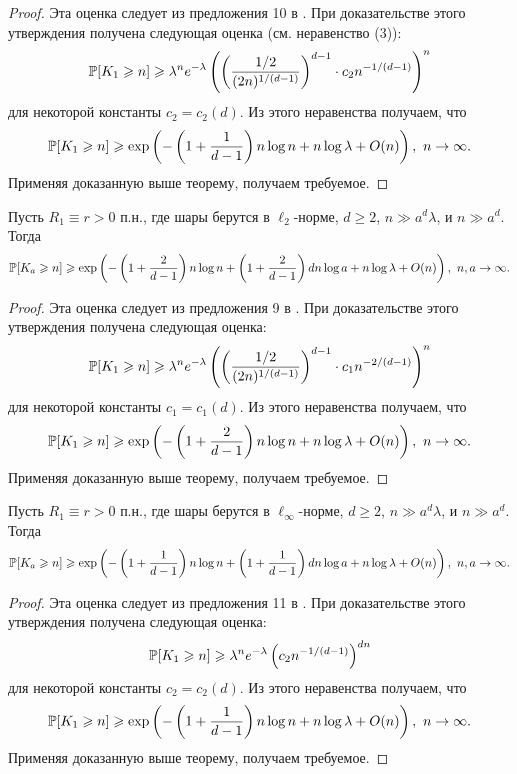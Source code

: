 \begin{proof}
    Эта оценка следует из предложения 10 в \cite{AL}. При доказательстве этого утверждения получена следующая оценка (см. неравенство (3)):
    $$\mathbb{P}[K_1 \geqslant n] \geqslant \lambda^n e^{-\lambda}\left(\left(\dfrac{1/2}{(2n)^{1/(d-1)}}\right)^{d-1}\cdot c_2n^{-1/(d-1)}\right)^n$$ для некоторой константы $c_2 = c_2(d)$. Из этого неравенства получаем, что
    $$\mathbb{P}[K_1 \geqslant n] \geqslant \exp \left(-\left(1+\dfrac{1}{d-1}\right)n\log n   +n\log\lambda + O(n)\right),\  n \to \infty.$$ Применяя доказанную выше теорему, получаем требуемое.
\end{proof}{}

\begin{cor}
Пусть $R_1\equiv r > 0$ п.н., где шары берутся в $\ell_2$-норме, $d\geq 2$, $n \gg a^d\lambda$, и $n\gg a^d$. 
Тогда $$\mathbb{P}[K_a \geqslant n] \geqslant \exp \left(-\left(1+\dfrac{2}{d-1}\right)n\log n + \left(1+\dfrac{2}{d-1}\right)dn\log a  +n\log\lambda + O(n)\right),\  n, a\to \infty.$$
\end{cor}{}

\begin{proof}
    Эта оценка следует из предложения 9 в \cite{AL}. При доказательстве этого утверждения получена следующая оценка:
    $$\mathbb{P}[K_1 \geqslant n] \geqslant \lambda^n e^{-\lambda}\left(\left(\dfrac{1/2}{(2n)^{1/(d-1)}}\right)^{d-1}\cdot c_1n^{-2/(d-1)}\right)^n$$ для некоторой константы $c_1 = c_1(d)$. Из этого неравенства получаем, что 
    $$\mathbb{P}[K_1 \geqslant n] \geqslant \exp \left(-\left(1+\dfrac{2}{d-1}\right)n\log n   +n\log\lambda + O(n)\right),\  n \to \infty.$$  Применяя доказанную выше теорему, получаем требуемое.
\end{proof}{}

\begin{cor}
Пусть $R_1\equiv r > 0$ п.н., где шары берутся в $\ell_\infty$-норме, $d\geq 2$, $n \gg a^d\lambda$, и $n\gg a^d$. 
Тогда $$\mathbb{P}[K_a \geqslant n] \geqslant \exp \left(-\left(1+\dfrac{1}{d-1}\right)n\log n + \left(1+\dfrac{1}{d-1}\right)dn\log a  +n\log\lambda + O(n)\right),\  n, a\to \infty.$$
\end{cor}{}

\begin{proof}
    Эта оценка следует из предложения 11 в \cite{AL}. При доказательстве этого утверждения получена следующая оценка:
    $$\mathbb{P}[K_1 \geqslant n] \geqslant \lambda^n e^{-\lambda}\left(c_2 n^{-1/(d-1)}\right)^{dn}$$ для некоторой константы $c_2 = c_2(d)$. Из этого неравенства получаем, что
    $$\mathbb{P}[K_1 \geqslant n] \geqslant \exp \left(-\left(1+\dfrac{1}{d-1}\right)n\log n   +n\log\lambda + O(n)\right),\  n \to \infty.$$ Применяя доказанную выше теорему, получаем требуемое.
\end{proof}{}

